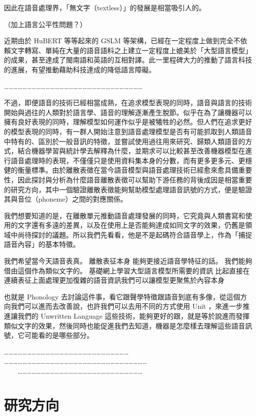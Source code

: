     因此在語音處理界，「無文字（textless）」的發展是相當吸引人的。

    （加上語言公平性問題？）

    近期由於 HuBERT 等等起來的 GSLM 等架構，已經在一定程度上做到完全不依賴文字轉寫、單純在大量的語音語料之上建立一定程度上媲美於「大型語言模型」的成果，甚至達成了閩南語和英語的互相對譯。此一里程碑大力的推動了語言科技的進展，有望推動藉助科技達成的降低語言障礙。

    ………………………………………………………………………………

    
    
   不過，即便語音的技術已經相當成熟，在追求模型表現的同時，語音與語言的技術開始與過往的人類對於語言學、語音的理解逐漸產生脫節。似乎在為了讓機器可以擁有良好表現的同時，理解模型如何運作似乎是被犧牲的必然。但人們在追求更好的模型表現的同時，有一群人開始注意到語音處理模型是否有可能抓取到人類語音中特有的、區別於一般音訊的特徵，並嘗試使用過往用來研究、歸類人類語音的方式，結合機器學習與統計學去解釋為什麼，並期求可以比較甚至改善機器模型在進行語音處理時的表現，不僅僅只是使用資料集本身的分數，而有更多更多元、更穩健的衡量標準。由於離散表徵在當今語音模型與語音處理技術已經愈來愈具備重要性，因此探討與分析為什麼語音離散表徵可以幫助下游任務的背後成因是相當重要的研究方向，其中一個驗證離散表徵能夠幫助模型處理語音訊號的方式，便是驗證其與音位（phoneme）之間的對應關係。

    我們想要知道的是，在離散單元推動語音處理發展的同時，它究竟與人類書寫和使用的文字還有多遠的差異，以及在使用上是否能夠達成如同文字的效果，仍舊是領域中尚待探討的議題。所以我們先看看，他是不是起碼符合語音學上，作為「捕捉語音內容」的基本特徵。

    我們希望當今天語音表真。 離散表征本身 能夠更接近語音學特征的話。 我們能夠借由這個作為類似文字的。 基礎網上學習大型語言模型所需要的資訊 比起直接在連續表征上面處理更加復雜的語音資訊我們可以讓模型更聚焦於內容本身 

    也就是 Phonology 去討論這件事，看它跟聲學特徵跟語音到底有多像，從這個方向我們可以進而去改善說，也許我們可以去用不同的方式使用 Unit ，來進一步推進讓我們的 Unwritten Language 這些技術，能夠更好的跟，就是等於說進而發揮類似文字的效果，然後同時也能促進我們去知道，機器是怎麼樣去理解這些語音訊號，它可能看的是哪些部分。

    ……………………………………………………………………… \\
    ………………………………………………………………………………… \\
　　………………………………………………………………………


\section{研究方向}  %

